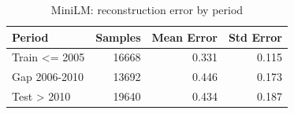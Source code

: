 \begin{table}[ht]
\centering
\caption{MiniLM: reconstruction error by period}
\label{tab:minilm_period_error_summary}
\begin{tabular}{lrrr}
\toprule
Period & Samples & Mean Error & Std Error \\
\midrule
Train <= 2005 & 16668 & 0.331 & 0.115 \\
Gap 2006-2010 & 13692 & 0.446 & 0.173 \\
Test > 2010 & 19640 & 0.434 & 0.187 \\
\bottomrule
\end{tabular}
\end{table}
